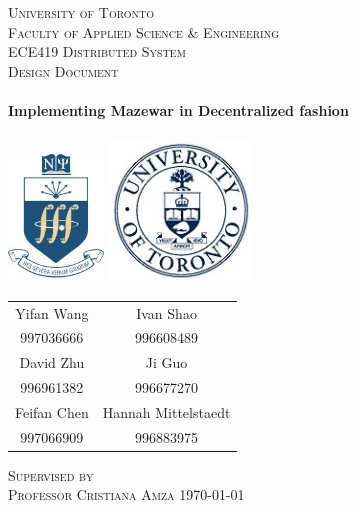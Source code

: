 \begin{titlepage}
\begin{center}

\textsc{\LARGE University of Toronto}
\\[1.5cm]
\textsc{\large Faculty of Applied Science \& Engineering}
\\[0.5cm]
\textsc{\large ECE419 Distributed System}
\\[1.5cm]
\textsc{\Large Design Document}
\\[1.5cm]
\HRule
\\[0.5cm]
{ \huge \bfseries Implementing Mazewar in Decentralized fashion}
\\[0.3cm]
\HRule
\\[0.5cm]

\includegraphics[width=1.0in]{./Logos/nscilogo}
\hspace{2cm}
\includegraphics[width=1.5in]{./Logos/utorontologo}
\\[1.0cm]

\begin{table}[h]
\centering
\renewcommand{\arraystretch}{1.5}
\begin{tabular}{c c}
Yifan Wang & Ivan Shao \\
997036666 & 996608489 \\
\hline
David Zhu & Ji Guo \\
996961382 & 996677270 \\
\hline
Feifan Chen & Hannah Mittelstaedt \\
997066909 & 996883975 \\
\end{tabular}
\end{table}

\textsc{Supervised by}
\\[0.25cm]
\textsc{\large Professor Cristiana Amza}
\vfill
{\large \today}

\end{center}
\end{titlepage} 
